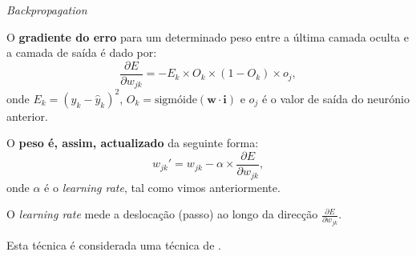 \begin{frame}{\textit{Backpropagation} \cont}
   
    O \textbf{gradiente do erro} para um determinado peso entre a última camada oculta e a camada de saída é dado por:
    \begin{equation}
        \frac{\partial E}{\partial w_{jk}} = -E_k \times O_k \times (1-O_k) \times o_j,
    \end{equation}
    onde $E_k = (y_k - \hat{y}_k)^2$, $O_k = \text{sigmóide}\left(\mathbf{w} \cdot \mathbf{i} \right)$ e $o_j$ é o valor de saída do neurónio anterior. 
    
    \pauseskip
    
    O \textbf{peso é, assim, actualizado} da seguinte forma:
    \begin{equation}
        w_{jk}' = w_{jk} - \alpha \times \frac{\partial E}{\partial w_{jk}},
    \end{equation}
    onde $\alpha$ é o \textit{learning rate}, tal como vimos anteriormente. 
    
    \pauseskip
    
    O \textit{learning rate} mede a deslocação (passo) ao longo da direcção $\frac{\partial E}{\partial w_{jk}}$.
    
    \pauseskip
    
    Esta técnica é considerada uma técnica de \textit{}.
    
    
\end{frame}

